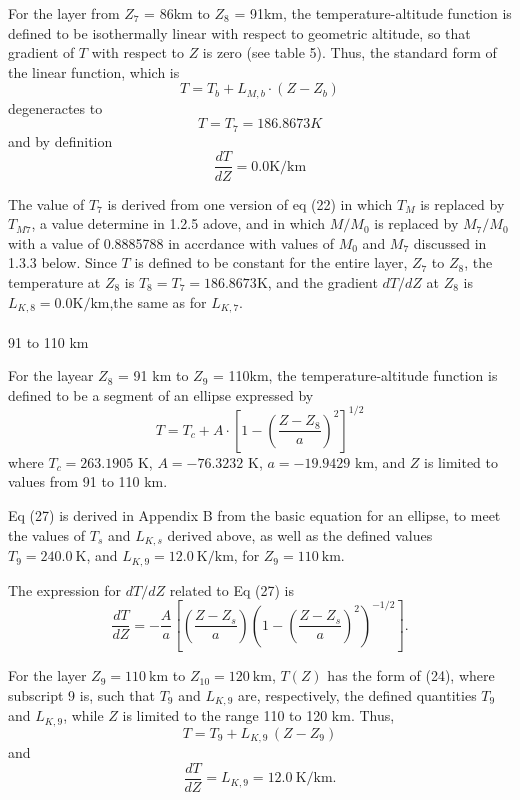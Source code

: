 \documentclass{article}
\begin{document}
For the layer from $Z_7$ = 86km to $Z_8$ = 91km, the temperature-altitude function is defined to be isothermally linear with respect to geometric altitude, so that gradient of $T$ with respect to $Z$ is zero (see table 5). Thus, the standard form of the linear function, which is
\begin{equation}
  T = T_b + L_{M,b}\cdot (Z - Z_b) 
  \tag{24}
\end{equation}
degeneractes to
\begin{equation}
  T= T_7 = 186.8673 K
  \tag{25}
\end{equation}
and by definition
\begin{equation}
  \frac{dT}{dZ} = 0.0 \text{K/km}
  \tag{26}
\end{equation}

The value of $T_7$ is derived from one version of eq (22) in which $T_M$ is replaced by $T_{M7}$, a value determine in 1.2.5 adove, and in which $M/M_0$ is replaced by $M_7/M_0$ with a value of 0.8885788 in accrdance with values of $M_0$ and $M_7$ discussed in 1.3.3 below. Since $T$ is defined to be constant for the entire layer, $Z_7$ to $Z_8$, the temperature at $Z_8$ is $T_8 = T_7 = 186.8673$K, and the gradient $dT/dZ$ at $Z_8$ is $L_{K,8} = 0.0\text{K/km}$,the same as for $L_{K,7}$.\\\\
91 to 110 km

For the layear $Z_8$ = 91 km to $Z_9$ = 110km, the temperature-altitude function is defined to be a segment of an ellipse expressed by
\begin{equation}
  T = T_c + A \cdot \left[ 1 - \left( \frac{Z - Z_8}{a} \right)^2 \right]^{1/2}
  \tag{27}
\end{equation}
where
$T_c = 263.1905$ K, $A = -76.3232$ K, $a = -19.9429$ km, and $Z$ is limited to values from 91 to 110 km.

Eq (27) is derived in Appendix B from the basic equation for an ellipse, to meet the values of $T_s$ and $L_{K,s}$ derived above, as well as the defined values $T_9 = 240.0~\text{K}$, and $L_{K,9} = 12.0~\text{K/km}$, for $Z_9 = 110~\text{km}$.

The expression for $dT/dZ$ related to Eq (27) is
\[
\frac{dT}{dZ} = -\frac{A}{a} \left[ \left(\frac{Z - Z_s}{a} \right) \left(1 - \left(\frac{Z - Z_s}{a} \right)^2 \right)^{-1/2} \right]. \tag{28}
\]

For the layer $Z_9 = 110~\text{km}$ to $Z_{10} = 120~\text{km}$, $T(Z)$ has the form of (24), where subscript 9 is, such that $T_9$ and $L_{K,9}$ are, respectively, the defined quantities $T_9$ and $L_{K,9}$, while $Z$ is limited to the range 110 to 120 km. Thus,
\[
T = T_9 + L_{K,9} \, (Z - Z_9) \tag{29}
\]
and
\[
\frac{dT}{dZ} = L_{K,9} = 12.0~\text{K/km}. \tag{30}
\]
\end{document}
